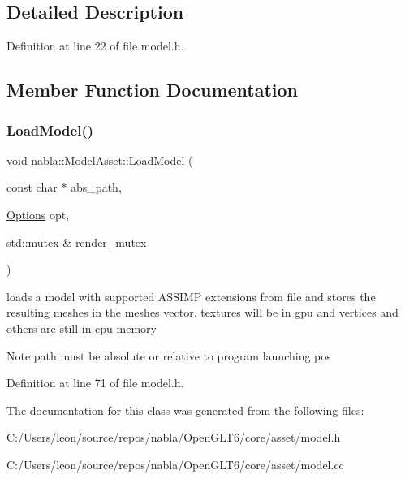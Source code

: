 \subsection{Detailed Description}


Definition at line 22 of file model.\+h.



\subsection{Member Function Documentation}
\mbox{\label{classnabla_1_1_model_asset_a9ca69dcb412880e8d09ae86f989fc5b4}} 
\subsubsection{\texorpdfstring{LoadModel()}{LoadModel()}}
{\footnotesize\ttfamily void nabla\+::\+Model\+Asset\+::\+Load\+Model (\begin{DoxyParamCaption}\item[{const char $\ast$}]{abs\+\_\+path,  }\item[{\mbox{\hyperlink{structnabla_1_1_model_asset_1_1_options}{Options}}}]{opt,  }\item[{std\+::mutex \&}]{render\+\_\+mutex }\end{DoxyParamCaption})\hspace{0.3cm}{\ttfamily [inline]}}

loads a model with supported A\+S\+S\+I\+MP extensions from file and stores the resulting meshes in the meshes vector. textures will be in gpu and vertices and others are still in cpu memory \begin{DoxyNote}{Note}
path must be absolute or relative to program launching pos 
\end{DoxyNote}


Definition at line 71 of file model.\+h.



The documentation for this class was generated from the following files\+:\begin{DoxyCompactItemize}
\item 
C\+:/\+Users/leon/source/repos/nabla/\+Open\+G\+L\+T6/core/asset/model.\+h\item 
C\+:/\+Users/leon/source/repos/nabla/\+Open\+G\+L\+T6/core/asset/model.\+cc\end{DoxyCompactItemize}
